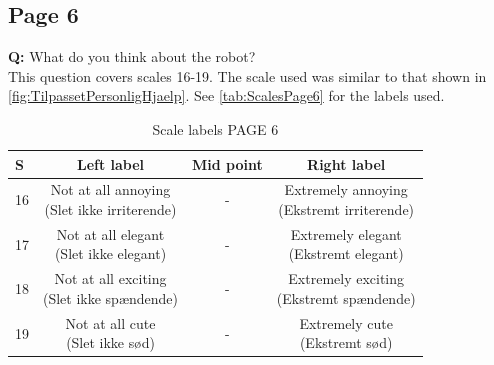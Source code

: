\subsection{Page 6}
\noindent
\textbf{Q:} What do you think about the robot?\\%
This question covers scales 16-19. The scale used was similar to that shown in \autoref{fig:TilpassetPersonligHjaelp}. See \autoref{tab:ScalesPage6} for the labels used.
%
\begin{table}[H]
	\centering
\caption{Scale labels PAGE 6}
	\label{tab:ScalesPage6} 
	\begin{tabular}{l|c|c|c}
		S     & Left label & Mid point & Right label \\\hline
		16   & \makecell{Not at all annoying\\(Slet ikke irriterende)}  & - & \makecell{Extremely annoying \\(Ekstremt irriterende)}        \\\hline
		17   & \makecell{Not at all elegant \\(Slet ikke elegant)} & - & \makecell{Extremely elegant \\(Ekstremt elegant)}         \\\hline
		18   & \makecell{Not at all exciting\\(Slet ikke spændende)} & - & \makecell{Extremely exciting \\(Ekstremt spændende)}         \\\hline
	 	19   & \makecell{Not at all cute\\(Slet ikke sød)} & - & \makecell{Extremely cute \\(Ekstremt sød)}               
	\end{tabular}        
\end{table}
\noindent
%
